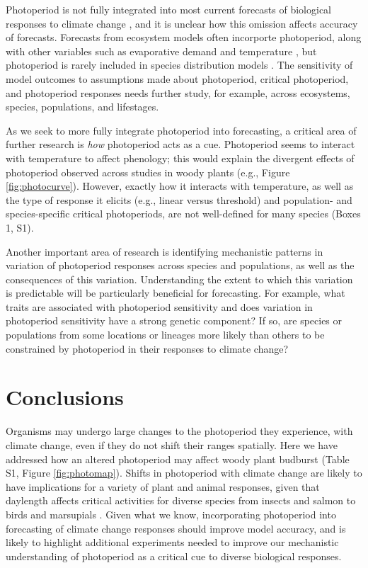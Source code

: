 \documentclass{article}
\begin{document}
\par Photoperiod is not fully integrated into most current forecasts of biological responses to climate change \citep [ but see][]{tobin2008}, and it is unclear how this omission affects accuracy of forecasts. Forecasts from ecosystem models often incorporte photoperiod, along with other variables such as evaporative demand and temperature \citep [e.g., ED] []{jolly2005, medvigy2013}, but photoperiod is rarely included in species distribution models \citep [e.g.,] []{morin2009,zhu2012}. The sensitivity of model outcomes to assumptions made about photoperiod, critical photoperiod, and photoperiod responses needs further study, for example, across ecosystems, species, populations, and lifestages.
\par As we seek to more fully integrate photoperiod into forecasting, a critical area of further research is \emph{how} photoperiod acts as a cue. Photoperiod seems to interact with temperature to affect phenology\citep[e.g., ][]{zydlewski2014}; this would explain the divergent effects of photoperiod observed across studies in woody plants (e.g., Figure \ref{fig:photocurve}). However, exactly how it interacts with temperature, as well as the type of response it elicits (e.g., linear versus threshold) and population- and species-specific critical photoperiods, are not well-defined for many species (Boxes 1, S1).  
\par Another important area of research is identifying  mechanistic patterns in variation of photoperiod responses across species and populations, as well as the consequences of this variation. Understanding the extent to which this variation is predictable will be particularly beneficial for forecasting. For example, what traits are associated with photoperiod sensitivity and does variation in photoperiod sensitivity have a strong genetic component? If so, are species or populations from some locations or lineages more likely than others to be constrained by photoperiod in their responses to climate change?

\section*{Conclusions}
Organisms may undergo large changes to the photoperiod they experience, with climate change, even if they do not shift their ranges spatially. Here we have addressed how an altered photoperiod may affect woody plant budburst (Table S1, Figure \ref{fig:photomap}). Shifts in photoperiod with climate change are likely to have implications for a variety of plant and animal responses, given that daylength affects critical activities for diverse species from insects \citep{bradshaw2006,linn1996} and salmon \citep{solbakken1994,taranger2003} to birds \citep{dawson2001} and marsupials \citep{mcallan2006,solbakken1994}. Given what we know, incorporating photoperiod into forecasting of climate change responses should improve model accuracy, and is likely to highlight additional experiments needed to improve our mechanistic understanding of photoperiod as a critical cue to diverse biological responses. 
\end{document}

